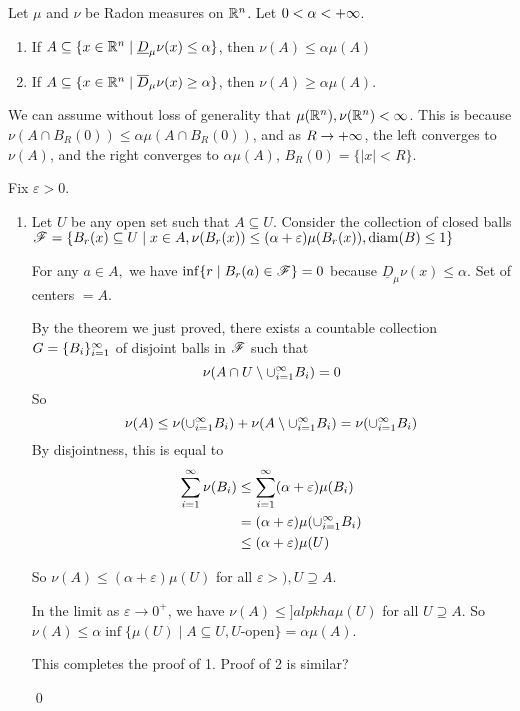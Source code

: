 \documentclass[x11names,reqno,14pt]{extarticle}
\newcommand{\seq}[2][\oo]{_{#2 = 1}^#1}
\newcommand{\cupi}[1][\oo]{\cup\seq[#1]{i}}
\DeclareMathOperator{\diam}{diam}
\begin{document}
\lem

Let $\mu$ and $\nu$ be Radon measures on $\mathbb{R}^n$. Let $0 < \alpha < +\infty$. 

\begin{enumerate}[label=(\roman*)]

\item If $A \subseteq \{x\in\mathbb{R}^n\mid\underline{D}_\mu\nu(x)\leq\alpha\}$, then $\nu(A)\leq\alpha\mu(A)$

\item If $A \subseteq \{x\in\mathbb{R}^n\mid\overline{D}_\mu\nu(x)\geq\alpha\}$, then $\nu(A)\geq\alpha\mu(A)$. 

\end{enumerate}

\proof

We can assume without loss of generality that $\mu(\mathbb{R}^n),\nu(\mathbb{R}^n)<\infty$. This is because $\nu(A \cap B_R(0)) \leq \alpha\mu(A \cap B_R(0))$, and as $R\to+\infty$, the left converges to $\nu(A)$, and the right converges to $\alpha\mu(A)$, $B_R(0) = \{|x|<R\}$. 

Fix $\varepsilon>0$. 

\begin{enumerate}[label=(\roman*)]

\item Let $U$ be any open set such that $A \subseteq U$. Consider the collection of closed balls $\ms{F} = \{B_r(x) \subseteq U \mid x\in A,\nu(B_r(x)) \leq (\alpha + \varepsilon)\mu(B_r(x)), \diam(B)\leq1\}$

For any $a \in A,$ we have $\inf\{r\mid B_r(a)\in\mathscr{F} \} = 0$ because $\underline{D}_\mu\nu(x)\leq\alpha$. Set of centers $=A$. 

By the theorem we just proved, there exists a countable collection $G = \{B_i\}\seq{i}$ of disjoint balls in $\mathscr{F}$ such that
\[
\nu(A\cap U \setminus\cupi B_i) = 0
\]
So
\[
\nu(A)\leq\nu(\cupi B_i) + \nu(A\setminus \cupi B_i) = \nu(\cupi B_i)
\]
By disjointness, this is equal to 
\begin{align*}
\sum\seq{i}\nu(B_i) & \leq\sum\seq{i}(\alpha+\varepsilon)\mu(B_i) \\
& = (\alpha + \varepsilon)\mu(\cupi B_i) \\
& \leq (\alpha + \varepsilon)\mu(U) \\
\end{align*}

So $\nu(A)\leq(\alpha+\varepsilon)\mu(U)$ for all $\varepsilon > ), U \supseteq A$. 

In the limit as $\varepsilon\to0^+$, we have $\nu(A)\leq]alpkha\mu(U)$ for all $U \supseteq A$. So $\nu(A) \leq \alpha\inf\{\mu(U)\mid A \subseteq U, U$-open$\} = \alpha\mu(A)$. 

This completes the proof of 1. Proof of 2 is similar? 

\qed

\end{enumerate}
\end{document}
